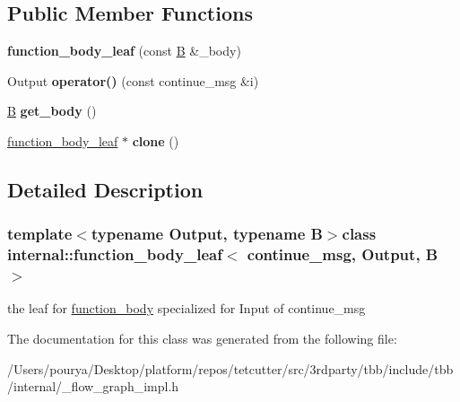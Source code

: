 \subsection*{Public Member Functions}
\begin{DoxyCompactItemize}
\item 
\hypertarget{classinternal_1_1function__body__leaf_3_01continue__msg_00_01Output_00_01B_01_4_aaa585296e1fb7a2485bc203021484830}{}{\bfseries function\+\_\+body\+\_\+leaf} (const \hyperlink{classB}{B} \&\+\_\+body)\label{classinternal_1_1function__body__leaf_3_01continue__msg_00_01Output_00_01B_01_4_aaa585296e1fb7a2485bc203021484830}

\item 
\hypertarget{classinternal_1_1function__body__leaf_3_01continue__msg_00_01Output_00_01B_01_4_a5f0fd60bc9e165d4f726e800d8c055e5}{}Output {\bfseries operator()} (const continue\+\_\+msg \&i)\label{classinternal_1_1function__body__leaf_3_01continue__msg_00_01Output_00_01B_01_4_a5f0fd60bc9e165d4f726e800d8c055e5}

\item 
\hypertarget{classinternal_1_1function__body__leaf_3_01continue__msg_00_01Output_00_01B_01_4_a3baa9669fb356003fc3078fabdb761a3}{}\hyperlink{classB}{B} {\bfseries get\+\_\+body} ()\label{classinternal_1_1function__body__leaf_3_01continue__msg_00_01Output_00_01B_01_4_a3baa9669fb356003fc3078fabdb761a3}

\item 
\hypertarget{classinternal_1_1function__body__leaf_3_01continue__msg_00_01Output_00_01B_01_4_a848b011981f69dbc2c54f6b8c0a99a22}{}\hyperlink{classinternal_1_1function__body__leaf}{function\+\_\+body\+\_\+leaf} $\ast$ {\bfseries clone} ()\label{classinternal_1_1function__body__leaf_3_01continue__msg_00_01Output_00_01B_01_4_a848b011981f69dbc2c54f6b8c0a99a22}

\end{DoxyCompactItemize}


\subsection{Detailed Description}
\subsubsection*{template$<$typename Output, typename B$>$class internal\+::function\+\_\+body\+\_\+leaf$<$ continue\+\_\+msg, Output, B $>$}

the leaf for \hyperlink{classinternal_1_1function__body}{function\+\_\+body} specialized for Input of continue\+\_\+msg 

The documentation for this class was generated from the following file\+:\begin{DoxyCompactItemize}
\item 
/\+Users/pourya/\+Desktop/platform/repos/tetcutter/src/3rdparty/tbb/include/tbb/internal/\+\_\+flow\+\_\+graph\+\_\+impl.\+h\end{DoxyCompactItemize}
